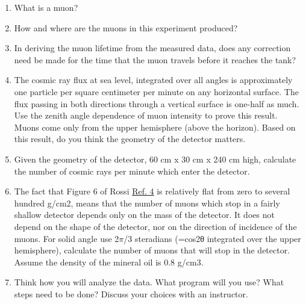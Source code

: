\documentclass{../signatures}
\begin{document}
\maketitle

\names

\prelab

\begin{enumerate}

    \item What is a muon?
    
    \item How and where are the muons in this experiment produced?

    \item In deriving the muon lifetime from the measured data, does any correction need be made for the time that the muon travels before it reaches the tank?

    \item The cosmic ray flux at sea level, integrated over all angles is approximately one particle per square centimeter per minute on any horizontal surface. The flux passing in both directions through a vertical surface is one-half as much. Use the zenith angle dependence of muon intensity to prove this result. Muons come only from the upper hemisphere (above the horizon). Based on this result, do you think the geometry of the detector matters.

    \item Given the geometry of the detector, 60 cm x 30 cm x 240 cm high, calculate the number of cosmic rays per minute which enter the detector.
    
    \item The fact that Figure 6 of Rossi \href{http://physics111.lib.berkeley.edu/Physics111/Reprints/MUO/02-Cosmic-Ray\_Phenomena.pdf}{Ref. 4} is relatively flat from zero to several hundred g/cm2, means that the number of muons which stop in a fairly shallow detector depends only on the mass of the detector. It does not depend on the shape of the detector, nor on the direction of incidence of the muons. For solid angle use 2$\pi$/3 steradians (=cos2θ integrated over the upper hemisphere), calculate the number of muons that will stop in the detector. Assume the density of the mineral oil is 0.8 g/cm3.

    \item Think how you will analyze the data. What program will you use? What steps need to be done? Discuss your choices with an instructor.
       \\[36pt]
\end{enumerate}
\end{document}
